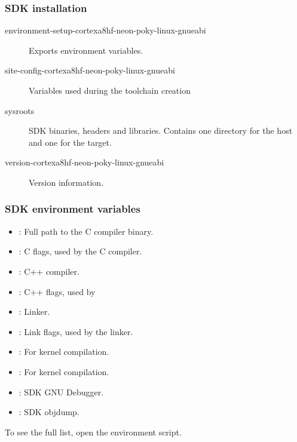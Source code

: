 \begin{frame}
  \frametitle{SDK installation}
  \begin{description}
    \item[environment-setup-cortexa8hf-neon-poky-linux-gnueabi] Exports environment
      variables.
    \item[site-config-cortexa8hf-neon-poky-linux-gnueabi] Variables used during the
      toolchain creation
    \item[sysroots] SDK binaries, headers and libraries. Contains
      one directory for the host and one for the target.
    \item[version-cortexa8hf-neon-poky-linux-gnueabi] Version information.
  \end{description}
\end{frame}

\begin{frame}
  \frametitle{SDK environment variables}
  \begin{itemize}
    \item {}: Full path to the C compiler binary.
    \item {}: C flags, used by the C compiler.
    \item {}: C++ compiler.
    \item {}: C++ flags, used by 
    \item {}: Linker.
    \item {}: Link flags, used by the linker.
    \item {}: For kernel compilation.
    \item {}: For kernel compilation.
    \item {}: SDK GNU Debugger.
    \item {}: SDK objdump.
  \end{itemize}
  To see the full list, open the environment script.
\end{frame}

